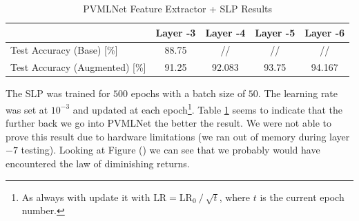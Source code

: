 \documentclass[10pt,a4paper]{report}
\begin{document}
\begin{table}[!ht]
\centering
\begin{tabular}{|l|c|c|c|c|}
\hline
                                   & Layer -3 & Layer -4 & Layer -5 & Layer -6 \\ \hline
Test Accuracy (Base) {[}\%{]}      & 88.75    & //       & //       & //       \\ \hline
Test Accuracy (Augmented) {[}\%{]} & 91.25    & 92.083   & 93.75    & 94.167   \\ \hline
\end{tabular}
\caption{PVMLNet Feature Extractor + SLP Results}
\label{tab:ft-pvmlnet}
\end{table}
The SLP was trained for $500$ epochs with a batch size of $50$. The learning rate was set at $10^{-3}$ and updated at each epoch\footnote{As always with update it with $\text{LR}=\text{LR}_0 \mathbin{/} \sqrt{t}$, where $t$ is the current epoch number.}. Table \ref{tab:ft-pvmlnet} seems to indicate that the further back we go into PVMLNet the better the result. We were not able to prove this result due to hardware limitations (we ran out of memory during layer $-7$ testing). Looking at Figure () we can see that we probably would have encountered the law of diminishing returns.
\end{document}
